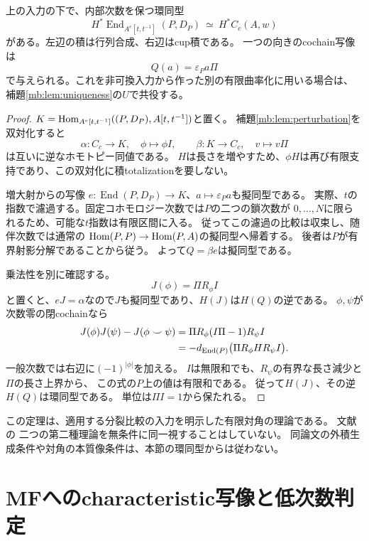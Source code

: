 \begin{theorem}[有限対角の乗法的bar比較]\label{mb:thm:yoneda-cup}
上の入力の下で、内部次数を保つ環同型
\[
 H^*\operatorname{End}_{A^e[t,t^{-1}]}(P,D_P)
 \ \simeq\ H^*C_c(A,w)
\]
がある。左辺の積は行列合成、右辺はcup積である。
一つの向きのcochain写像は
\begin{equation}\label{mb:eq:q-map}
 Q(a)=\varepsilon_Pa\Pi
\end{equation}
で与えられる。これを非可換入力から作った別の有限曲率化に用いる場合は、
補題\ref{mb:lem:uniqueness}の$U$で共役する。
\end{theorem}
\begin{proof}
$K=\operatorname{Hom}_{A^e[t,t^{-1}]}((P,D_P),A[t,t^{-1}])$と置く。
補題\ref{mb:lem:perturbation}を双対化すると
\[
 \alpha:C_c\longrightarrow K,\quad\phi\longmapsto\phi I,
 \qquad
 \beta:K\longrightarrow C_c,\quad v\longmapsto v\Pi
\]
は互いに逆なホモトピー同値である。
$H$は長さを増やすため、$\phi H$は再び有限支持であり、この双対化に積totalizationを要しない。

増大射からの写像
$e:\operatorname{End}(P,D_P)\to K$、$a\mapsto\varepsilon_Pa$も擬同型である。
実際、$t$の指数で濾過する。固定コホモロジー次数では$P$の二つの鎖次数が
$0,\ldots,N$に限られるため、可能な$t$指数は有限区間に入る。
従ってこの濾過の比較は収束し、随伴次数では通常の
$\operatorname{Hom}(P,P)\to\operatorname{Hom}(P,A)$の擬同型へ帰着する。
後者は$P$が有界射影分解であることから従う。
よって$Q=\beta e$は擬同型である。

乗法性を別に確認する。
\[
 J(\phi)=\Pi R_\phi I
\]
と置くと、$eJ=\alpha$なので$J$も擬同型であり、$H(J)$は$H(Q)$の逆である。
$\phi,\psi$が次数零の閉cochainなら
\begin{align}
 J(\phi)J(\psi)-J(\phi\smile\psi)
 &=\Pi R_\phi(I\Pi-1)R_\psi I\notag\\
 &=-d_{\operatorname{End}(P)}\bigl(\Pi R_\phi H R_\psi I\bigr).
 \label{mb:eq:product-homotopy}
\end{align}
一般次数では右辺に$(-1)^{|\phi|}$を加える。
$I$は無限和でも、$R_\psi$の有界な長さ減少と$\Pi$の長さ上界から、
この式の$P$上の値は有限和である。
従って$H(J)$、その逆$H(Q)$は環同型である。
単位は$\Pi I=1$から保たれる。
\end{proof}

この定理は、適用する分裂比較の入力を明示した有限対角の理論である。
文献\cite[Theorem~6.14, Remark~6.16]{MBGHLR}の
二つの第二種理論を無条件に同一視することはしていない。
同論文の外積生成条件や対角の本質像条件は、本節の環同型からは従わない。

\section{MFへのcharacteristic写像と低次数判定}
\label{mb:sec:characteristic}

